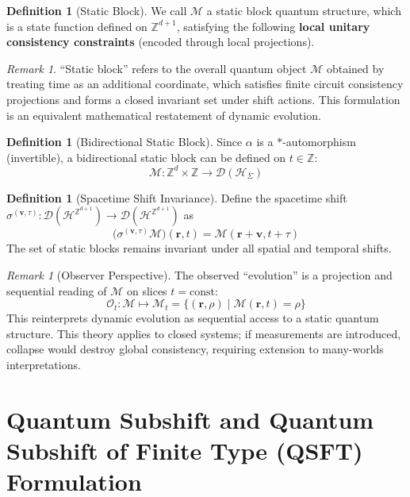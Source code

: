 \documentclass[11pt]{article}
\theoremstyle{definition}
\newtheorem{definition}[theorem]{Definition}
\theoremstyle{remark}
\newtheorem{remark}[theorem]{Remark}
\begin{document}
\begin{definition}[Static Block]\label{def:qstaticblock}
We call \( \mathcal{M} \) a static block quantum structure, which is a state function defined on \( \mathbb{Z}^{d+1} \), satisfying the following \textbf{local unitary consistency constraints} (encoded through local projections).
\end{definition}

\begin{remark}
``Static block'' refers to the overall quantum object \( \mathcal{M} \) obtained by treating time as an additional coordinate, which satisfies finite circuit consistency projections and forms a closed invariant set under shift actions. This formulation is an equivalent mathematical restatement of dynamic evolution.
\end{remark}

\begin{definition}[Bidirectional Static Block]\label{def:qbidir}
Since \( \alpha \) is a \( * \)-automorphism (invertible), a bidirectional static block can be defined on \( t \in \mathbb{Z} \):
\[
\mathcal{M}: \mathbb{Z}^d \times \mathbb{Z} \to \mathcal{D}(\mathcal{H}_\Sigma)
\]
\end{definition}

\begin{definition}[Spacetime Shift Invariance]\label{def:qstshift}
Define the spacetime shift \( \sigma^{(\mathbf{v},\tau)}: \mathcal{D}(\mathcal{H}^{\mathbb{Z}^{d+1}}) \to \mathcal{D}(\mathcal{H}^{\mathbb{Z}^{d+1}}) \) as
\[
\big(\sigma^{(\mathbf{v},\tau)}\mathcal{M}\big)(\mathbf{r},t) = \mathcal{M}(\mathbf{r}+\mathbf{v}, t+\tau)
\]
The set of static blocks remains invariant under all spatial and temporal shifts.
\end{definition}

\begin{remark}[Observer Perspective]\label{rem:3.3}
The observed ``evolution'' is a projection and sequential reading of \( \mathcal{M} \) on slices \( t = \mathrm{const} \):
\[
\mathcal{O}_t: \mathcal{M} \mapsto \mathcal{M}_t = \{ (\mathbf{r}, \rho) \mid \mathcal{M}(\mathbf{r}, t) = \rho \}
\]
This reinterprets dynamic evolution as sequential access to a static quantum structure. This theory applies to closed systems; if measurements are introduced, collapse would destroy global consistency, requiring extension to many-worlds interpretations.
\end{remark}

\section{Quantum Subshift and Quantum Subshift of Finite Type (QSFT) Formulation}\label{sec:qsubshift}
\end{document}
